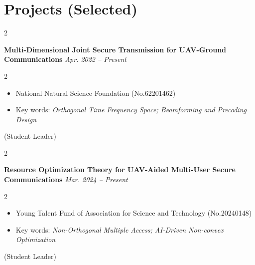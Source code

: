 \documentclass[10pt, letterpaper]{article}
\newenvironment{highlights}{
    \begin{itemize}[
        topsep=0.10 cm,
        parsep=0.10 cm,
        partopsep=0pt,
        itemsep=0pt,
        leftmargin=0 cm + 10pt
    ]
}{
    \end{itemize}
} %
\newenvironment{twocolentry}[2][]{
    \onecolentry
    \def\secondColumn{#2}
    \setcolumnwidth{\fill, 4.5 cm}
    \begin{paracol}{2}
}{
    \switchcolumn \raggedleft \secondColumn
    \end{paracol}
    \endonecolentry
} %
\begin{document}
    \section{Projects {\footnotesize{(Selected)}}}

       
        \begin{twocolentry}{
            \textit{Apr. 2022 – Present}
        }
            \textbf{Multi-Dimensional Joint Secure Transmission for UAV-Ground Communications}\end{twocolentry}

        \vspace{0.10 cm}

        \begin{twocolentry}{
                    (Student Leader) 
        }
            \begin{highlights}
            \item National Natural Science Foundation {\footnotesize{(No.62201462)}}
                \item Key words: \textit{Orthogonal Time Frequency Space; Beamforming and Precoding Design}
            \end{highlights}
            \end{twocolentry}

        \vspace{0.1 cm}
        

        \begin{twocolentry}{
            \textit{Mar. 2024 – Present}
        }
            \textbf{Resource Optimization Theory for UAV-Aided Multi-User Secure Communications}\end{twocolentry}

        \vspace{0.10 cm}
        
        \begin{twocolentry}{
                    (Student Leader) 
        }
            \begin{highlights}
            \item Young Talent Fund of Association for Science and Technology {\footnotesize{(No.20240148)}}
            \item Key words: \textit{Non-Orthogonal Multiple Access; AI-Driven Non-convex Optimization}
        \end{highlights}
        \end{twocolentry}

        \vspace{0.1 cm}
        
\end{document}
